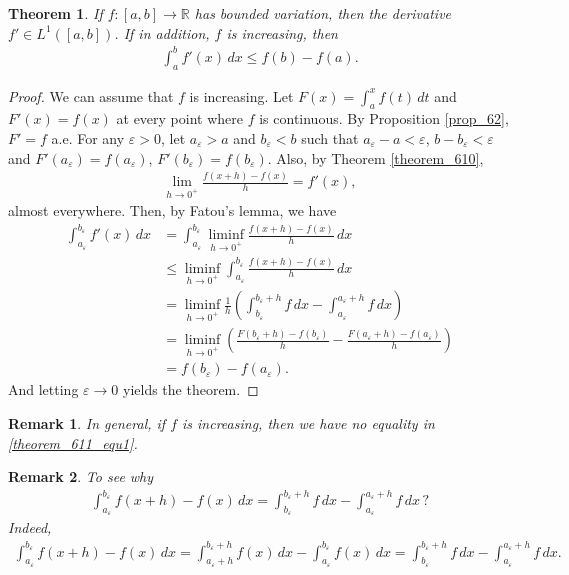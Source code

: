 \documentclass[11pt]{book}
\newtheorem{theorem}{Theorem}[chapter]
\newtheorem{remark}{Remark}[chapter]
\theoremstyle{definition}
\numberwithin{equation}{chapter}
\begin{document}
\begin{theorem}\label{theorem_611}
If $f: [a,b] \to \mathbb{R}$ has bounded variation, then the derivative $f' \in L^1([a,b])$. If in addition, $f$ is increasing, then
\begin{align}\label{theorem_611_equ1}
    \int^b_a f'(x)\,dx \leq f(b) - f(a).
\end{align}
\end{theorem}
\begin{proof}
We can assume that $f$ is increasing. Let $F(x) = \int^x_a f(t) \,dt$ and $F'(x) = f(x)$ at every point where $f$ is continuous. By Proposition \ref{prop_62}, $F' = f$ a.e. For any $\varepsilon > 0$, let $a_\varepsilon > a$ and $b_\varepsilon < b$ such that 
$a_\varepsilon - a < \varepsilon$, $b - b_\varepsilon < \varepsilon$ and $F'(a_\varepsilon) = f(a_\varepsilon)$, $F'(b_\varepsilon) = f(b_\varepsilon)$. Also, by Theorem \ref{theorem_610}, 
\begin{align*}
    \lim_{h \to 0^+} \frac{f(x+h) - f(x)}{h} = f'(x),
\end{align*}
almost everywhere. Then, by Fatou's lemma, we have
\begin{align*}
    \int^{b_\varepsilon}_{a_\varepsilon} f'(x)\,dx & = \int^{b_\varepsilon}_{a_\varepsilon} \liminf_{h\to 0^+} \frac{f(x+h) - f(x)}{h}\,dx \\
    & \leq \liminf_{h\to 0^+} \int^{b_\varepsilon}_{a_\varepsilon} \frac{f(x+h) - f(x)}{h}\,dx \\
    & = \liminf_{h\to 0^+} \frac{1}{h} \left(\int^{b_\varepsilon+h}_{b_\varepsilon} f \,dx - \int^{a_\varepsilon+h}_{a_\varepsilon} f \,dx\right) \\
    & = \liminf_{h\to 0^+} \left(\frac{F(b_\varepsilon+h) - f(b_\varepsilon)}{h}- \frac{F(a_\varepsilon+h) - f(a_\varepsilon)}{h}\right) \\
    & = f(b_\varepsilon) - f(a_\varepsilon).
\end{align*}And letting $\varepsilon \to 0$ yields the theorem.
\end{proof}

\medskip

\begin{remark}
In general, if $f$ is increasing, then we have no equality in \eqref{theorem_611_equ1}.
\end{remark}

\medskip

\begin{remark}
To see why 
\begin{align*}
    \int^{b_\varepsilon}_{a_\varepsilon} f(x+h) - f(x)\,dx =  \int^{b_\varepsilon+h}_{b_\varepsilon} f \,dx - \int^{a_\varepsilon+h}_{a_\varepsilon} f \,dx \,?
\end{align*}
Indeed,
\begin{align*}
    \int^{b_\varepsilon}_{a_\varepsilon} f(x+h) - f(x)\,dx = \int^{b_\varepsilon+h}_{a_\varepsilon+h} f(x) \,dx - \int^{b_\varepsilon}_{a_\varepsilon} f(x)\,dx = \int^{b_\varepsilon+h}_{b_\varepsilon} f \,dx - \int^{a_\varepsilon+h}_{a_\varepsilon} f \,dx.
\end{align*}
\end{remark}
\end{document}
